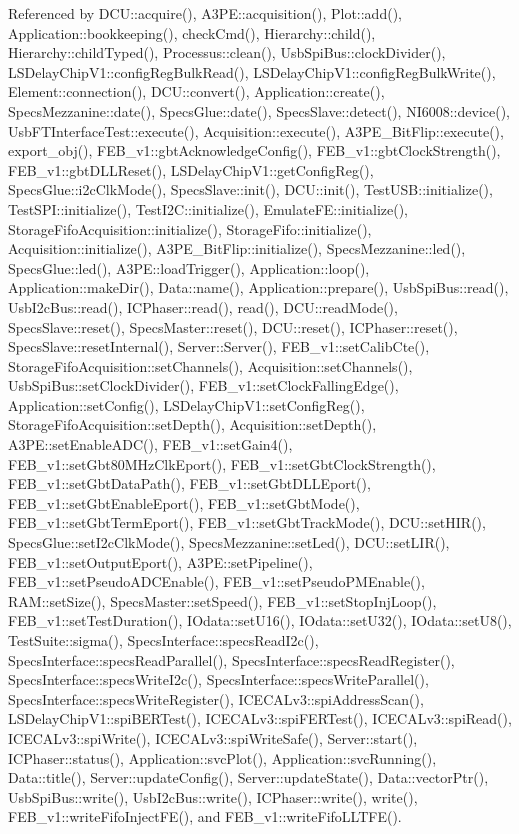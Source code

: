 Referenced by DCU::acquire(), A3PE::acquisition(), Plot::add(), Application::bookkeeping(), checkCmd(), Hierarchy::child(), Hierarchy::childTyped(), Processus::clean(), UsbSpiBus::clockDivider(), LSDelayChipV1::configRegBulkRead(), LSDelayChipV1::configRegBulkWrite(), Element::connection(), DCU::convert(), Application::create(), SpecsMezzanine::date(), SpecsGlue::date(), SpecsSlave::detect(), NI6008::device(), UsbFTInterfaceTest::execute(), Acquisition::execute(), A3PE\_\-BitFlip::execute(), export\_\-obj(), FEB\_\-v1::gbtAcknowledgeConfig(), FEB\_\-v1::gbtClockStrength(), FEB\_\-v1::gbtDLLReset(), LSDelayChipV1::getConfigReg(), SpecsGlue::i2cClkMode(), SpecsSlave::init(), DCU::init(), TestUSB::initialize(), TestSPI::initialize(), TestI2C::initialize(), EmulateFE::initialize(), StorageFifoAcquisition::initialize(), StorageFifo::initialize(), Acquisition::initialize(), A3PE\_\-BitFlip::initialize(), SpecsMezzanine::led(), SpecsGlue::led(), A3PE::loadTrigger(), Application::loop(), Application::makeDir(), Data::name(), Application::prepare(), UsbSpiBus::read(), UsbI2cBus::read(), ICPhaser::read(), read(), DCU::readMode(), SpecsSlave::reset(), SpecsMaster::reset(), DCU::reset(), ICPhaser::reset(), SpecsSlave::resetInternal(), Server::Server(), FEB\_\-v1::setCalibCte(), StorageFifoAcquisition::setChannels(), Acquisition::setChannels(), UsbSpiBus::setClockDivider(), FEB\_\-v1::setClockFallingEdge(), Application::setConfig(), LSDelayChipV1::setConfigReg(), StorageFifoAcquisition::setDepth(), Acquisition::setDepth(), A3PE::setEnableADC(), FEB\_\-v1::setGain4(), FEB\_\-v1::setGbt80MHzClkEport(), FEB\_\-v1::setGbtClockStrength(), FEB\_\-v1::setGbtDataPath(), FEB\_\-v1::setGbtDLLEport(), FEB\_\-v1::setGbtEnableEport(), FEB\_\-v1::setGbtMode(), FEB\_\-v1::setGbtTermEport(), FEB\_\-v1::setGbtTrackMode(), DCU::setHIR(), SpecsGlue::setI2cClkMode(), SpecsMezzanine::setLed(), DCU::setLIR(), FEB\_\-v1::setOutputEport(), A3PE::setPipeline(), FEB\_\-v1::setPseudoADCEnable(), FEB\_\-v1::setPseudoPMEnable(), RAM::setSize(), SpecsMaster::setSpeed(), FEB\_\-v1::setStopInjLoop(), FEB\_\-v1::setTestDuration(), IOdata::setU16(), IOdata::setU32(), IOdata::setU8(), TestSuite::sigma(), SpecsInterface::specsReadI2c(), SpecsInterface::specsReadParallel(), SpecsInterface::specsReadRegister(), SpecsInterface::specsWriteI2c(), SpecsInterface::specsWriteParallel(), SpecsInterface::specsWriteRegister(), ICECALv3::spiAddressScan(), LSDelayChipV1::spiBERTest(), ICECALv3::spiFERTest(), ICECALv3::spiRead(), ICECALv3::spiWrite(), ICECALv3::spiWriteSafe(), Server::start(), ICPhaser::status(), Application::svcPlot(), Application::svcRunning(), Data::title(), Server::updateConfig(), Server::updateState(), Data::vectorPtr(), UsbSpiBus::write(), UsbI2cBus::write(), ICPhaser::write(), write(), FEB\_\-v1::writeFifoInjectFE(), and FEB\_\-v1::writeFifoLLTFE().


